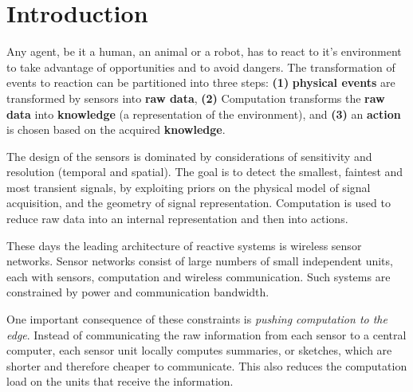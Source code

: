 \section{Introduction}
Any agent, be it a human, an animal or a robot, has to react to it's environment to take advantage of opportunities and to avoid dangers. The transformation of events to reaction can be partitioned into three steps: {\bf(1)} {\bf physical events} are transformed by sensors into {\bf raw data}, {\bf (2)} Computation transforms the {\bf raw data} into {\bf knowledge} (a representation of the environment), and {\bf (3)} an {\bf action} is chosen based on the acquired {\bf knowledge}.


The design of the sensors is dominated by considerations of sensitivity and resolution (temporal and spatial).  The goal is to detect the smallest, faintest and most transient signals,
by exploiting priors on the physical model of signal acquisition, and the geometry of signal representation. Computation is used to reduce raw data into an internal representation and then into actions. 

These days the leading architecture of reactive systems is wireless sensor networks. Sensor networks consist of large numbers of small independent units, each with sensors, computation and wireless communication. Such systems are constrained by power and communication bandwidth. 

One important consequence of these constraints is {\em pushing computation to the edge}. Instead of communicating the raw information from each sensor to a central computer, each sensor unit locally computes summaries, or sketches, which are shorter and therefore cheaper to communicate. This also reduces the computation load on the units that receive the information.

